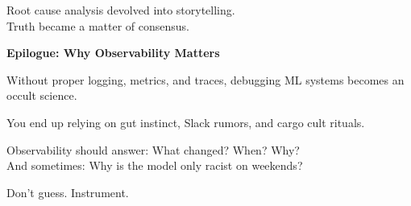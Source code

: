 Root cause analysis devolved into storytelling.\\
Truth became a matter of consensus.

\vspace{1em}
\textbf{Epilogue: Why Observability Matters}

Without proper logging, metrics, and traces, debugging ML systems becomes an occult science.

You end up relying on gut instinct, Slack rumors, and cargo cult rituals.

Observability should answer: What changed? When? Why? \\
And sometimes: Why is the model only racist on weekends?

Don't guess. Instrument.

